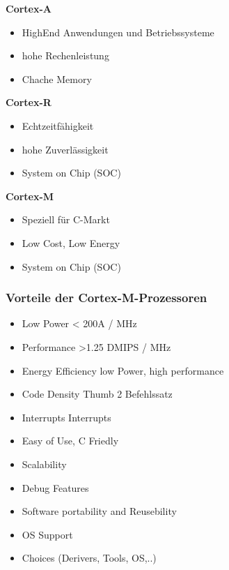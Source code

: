 \begin{multicols}{3}
\textbf{Cortex-A}
    \begin{itemize}
        \item HighEnd Anwendungen und Betriebssysteme
        \item hohe Rechenleistung
        \item Chache Memory
    \end{itemize}
    
    \textbf{Cortex-R}
    \begin{itemize}
        \item Echtzeitfähigkeit
        \item hohe Zuverlässigkeit
        \item System on Chip (SOC) 
    \end{itemize}  
    
    \textbf{Cortex-M}
    \begin{itemize}
        \item Speziell für \mu C-Markt
        \item Low Cost, Low Energy
        \item System on Chip (SOC) 
    \end{itemize}             
\end{multicols}

\subsubsection{Vorteile der Cortex-M-Prozessoren}
\begin{multicols}{2}
    \begin{itemize}
        \item Low Power
            \subitem < 200\mu A / MHz
        \item Performance
            \subitem >1.25 DMIPS / MHz
        \item Energy Efficiency
            \subitem low Power, high performance
        \item Code Density
            \subitem Thumb 2 Befehlssatz
        \item Interrupts
             Interrupts
        \item Easy of Use, C Friedly
        \item Scalability
        \item Debug Features
        \item Software portability and Reusebility
        \item OS Support
        \item Choices (Derivers, Tools, OS,..)    
    \end{itemize}
\end{multicols}





















